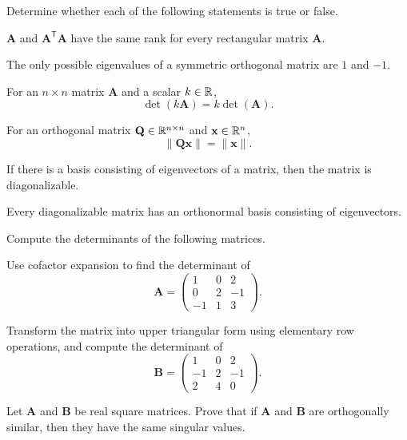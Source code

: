 \documentclass[11pt,oneside]{article}
\begin{document}
\begin{problem}
Determine whether each of the following statements is true or false.
\begin{problemchoices}
\item $\mathbf A$ and $\mathbf A^{\mathsf T}\mathbf A$ have the same rank for every rectangular matrix $\mathbf A$.
\item The only possible eigenvalues of a symmetric orthogonal matrix are $1$ and $-1$.
\item For an $n\times n$ matrix $\mathbf A$ and a scalar $k\in\mathbb{R}$,
\[
\det(k\mathbf A)=k\det(\mathbf A).
\]
\item For an orthogonal matrix $\mathbf Q\in\mathbb{R}^{n\times n}$ and $\mathbf x\in\mathbb{R}^n$,
\[
\|\mathbf Q\mathbf x\|=\|\mathbf x\|.
\]
\item If there is a basis consisting of eigenvectors of a matrix, then the matrix is diagonalizable.
\item Every diagonalizable matrix has an orthonormal basis consisting of eigenvectors.
\end{problemchoices}
\end{problem}

\begin{problem}
Compute the determinants of the following matrices.
\begin{problemsubparts}
\item Use cofactor expansion to find the determinant of
\[
\mathbf A=
\begin{pmatrix}
1&0&2\\
0&2&-1\\
-1&1&3
\end{pmatrix}.
\]
\item Transform the matrix into upper triangular form using elementary row operations, and compute the determinant of
\[
\mathbf B=
\begin{pmatrix}
1&0&2\\
-1&2&-1\\
2&4&0
\end{pmatrix}.
\]
\end{problemsubparts}
\end{problem}

\begin{problem}
Let $\mathbf A$ and $\mathbf B$ be real square matrices. Prove that if $\mathbf A$ and $\mathbf B$ are orthogonally similar, then they have the same singular values.
\end{problem}
\end{document}
